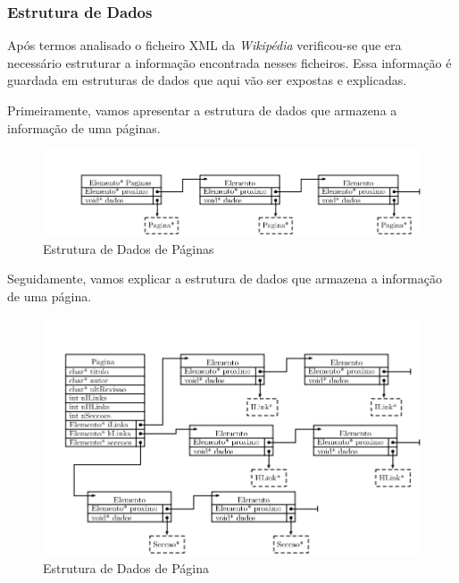 \documentclass[11pt, a4paper, oneside]{article}
\begin{document}
\subsubsection{Estrutura de Dados}

Após termos analisado o ficheiro XML da \textit{Wikipédia} verificou-se que era necessário estruturar a informação encontrada nesses ficheiros. Essa informação é guardada em estruturas de dados que aqui vão ser expostas e explicadas. 

Primeiramente, vamos apresentar a estrutura de dados que armazena a informação de uma páginas.
\begin{figure}[h]
\begin{center}
\includegraphics[width=0.9\linewidth]{paginas}
\caption{Estrutura de Dados de Páginas}
\end{center}
\end{figure}

Seguidamente, vamos explicar a estrutura de dados que armazena a informação de uma página.
\begin{figure}[h]
\begin{center}
\includegraphics[width=0.9\linewidth]{pagina}
\caption{Estrutura de Dados de Página}
\end{center}
\end{figure}
\end{document}
